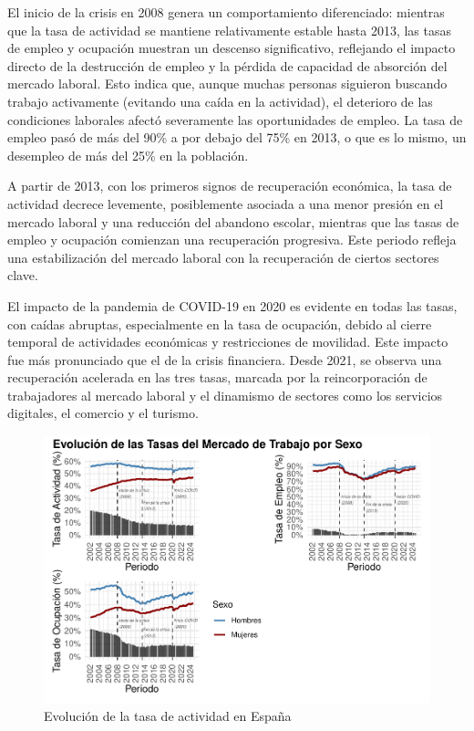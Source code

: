 \documentclass[notspecified,article,submit,moreauthors,pdftex]{Definitions/mdpi}
\begin{document}
El inicio de la crisis en 2008 genera un comportamiento diferenciado:
mientras que la tasa de actividad se mantiene relativamente estable
hasta 2013, las tasas de empleo y ocupación muestran un descenso
significativo, reflejando el impacto directo de la destrucción de empleo
y la pérdida de capacidad de absorción del mercado laboral. Esto indica
que, aunque muchas personas siguieron buscando trabajo activamente
(evitando una caída en la actividad), el deterioro de las condiciones
laborales afectó severamente las oportunidades de empleo. La tasa de
empleo pasó de más del 90\% a por debajo del 75\% en 2013, o que es lo
mismo, un desempleo de más del 25\% en la población.

A partir de 2013, con los primeros signos de recuperación económica, la
tasa de actividad decrece levemente, posiblemente asociada a una menor
presión en el mercado laboral y una reducción del abandono escolar,
mientras que las tasas de empleo y ocupación comienzan una recuperación
progresiva. Este periodo refleja una estabilización del mercado laboral
con la recuperación de ciertos sectores clave.

El impacto de la pandemia de COVID-19 en 2020 es evidente en todas las
tasas, con caídas abruptas, especialmente en la tasa de ocupación,
debido al cierre temporal de actividades económicas y restricciones de
movilidad. Este impacto fue más pronunciado que el de la crisis
financiera. Desde 2021, se observa una recuperación acelerada en las
tres tasas, marcada por la reincorporación de trabajadores al mercado
laboral y el dinamismo de sectores como los servicios digitales, el
comercio y el turismo.

\begin{figure}[h]

{\centering \includegraphics[width=1\linewidth]{ProyectoAED2024_files/figure-latex/unnamed-chunk-28-1} 

}

\caption{Evolución de la tasa de actividad en España}\label{fig:unnamed-chunk-28}
\end{figure}
\end{document}
